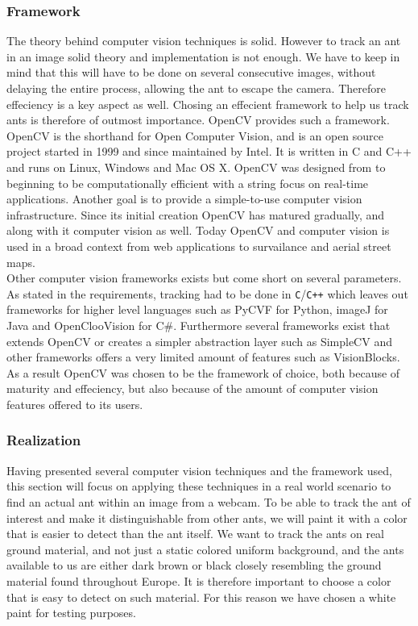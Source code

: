 \subsubsection{Framework} \mbox{}\par
\label{framework}
The theory behind computer vision techniques is solid. However to track an ant in an image solid theory and implementation is not enough. We have to keep in mind that this will have to be done on several consecutive images, without delaying the entire process, allowing the ant to escape the camera. Therefore effeciency is a key aspect as well. Chosing an effecient framework to help us track ants is therefore of outmost importance. OpenCV provides such a framework.\\

OpenCV is the shorthand for Open Computer Vision, and is an open source project started in 1999 and since maintained by Intel. It is written in C and C++ and runs on Linux, Windows and Mac OS X. OpenCV was designed from to beginning to be computationally efficient with a string focus on real-time applications. Another goal is to provide a simple-to-use computer vision infrastructure. Since its initial creation OpenCV has matured gradually, and along with it computer vision as well. Today OpenCV and computer vision is used in a broad context from web applications to survailance and aerial street maps.\\

Other computer vision frameworks exists but come short on several parameters. As stated in the requirements, tracking had to be done in \texttt{C}/\texttt{C++} which leaves out frameworks for higher level languages such as PyCVF for Python, imageJ for Java and OpenClooVision for C\#. Furthermore several frameworks exist that extends OpenCV or creates a simpler abstraction layer such as SimpleCV and other frameworks offers a very limited amount of features such as VisionBlocks. As a result OpenCV was chosen to be the framework of choice, both because of maturity and effeciency, but also because of the amount of computer vision features offered to its users.

\subsubsection{Realization} \mbox{}\par
Having presented several computer vision techniques and the framework used, this section will focus on applying these techniques in a real world scenario to find an actual ant within an image from a webcam. To be able to track the ant of interest and make it distinguishable from other ants, we will paint it with a color that is easier to detect than the ant itself. We want to track the ants on real ground material, and not just a static colored uniform background, and the ants available to us are either dark brown or black closely resembling the ground material found throughout Europe. It is therefore important to choose a color that is easy to detect on such material. For this reason we have chosen a white paint for testing purposes.\\

